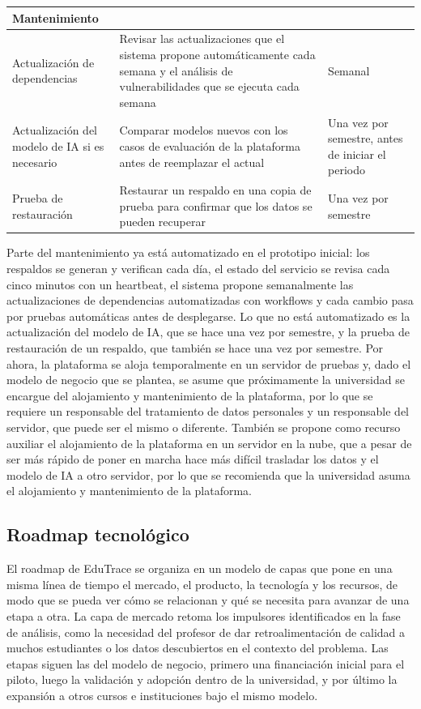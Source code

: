 \documentclass[letterpaper, 10 pt, conference]{ieeeconf}
\begin{document}
\begin{table}[t]
\begin{tabular}{|p{3.6cm}|p{10.6cm}|p{2.4cm}|}
\multicolumn{3}{|l|}{\textbf{Mantenimiento}} \\ \hline
Actualización de dependencias & Revisar las actualizaciones que el sistema propone automáticamente cada semana y el análisis de vulnerabilidades que se ejecuta cada semana & Semanal \\ \hline
Actualización del modelo de IA si es necesario & Comparar modelos nuevos con los casos de evaluación de la plataforma antes de reemplazar el actual  & Una vez por semestre, antes de iniciar el periodo \\ \hline
Prueba de restauración & Restaurar un respaldo en una copia de prueba para confirmar que los datos se pueden recuperar & Una vez por semestre \\ \hline
\end{tabular}
\end{table}

Parte del mantenimiento ya está automatizado en el prototipo inicial: los respaldos se generan y verifican cada día, el estado del servicio se revisa cada cinco minutos con un heartbeat, el sistema propone semanalmente las actualizaciones de dependencias automatizadas con workflows y cada cambio pasa por pruebas automáticas antes de desplegarse.
Lo que no está automatizado es la actualización del modelo de IA, que se hace una vez por semestre, y la prueba de restauración de un respaldo, que también se hace una vez por semestre.
Por ahora, la plataforma se aloja temporalmente en un servidor de pruebas y, dado el modelo de negocio que se plantea, se asume que próximamente la universidad se encargue del alojamiento y mantenimiento de la plataforma, por lo que se requiere un responsable del tratamiento de datos personales y un responsable del servidor, que puede ser el mismo o diferente.
También se propone como recurso auxiliar el alojamiento de la plataforma en un servidor en la nube, que a pesar de ser más rápido de poner en marcha hace más difícil trasladar los datos y el modelo de IA a otro servidor, por lo que se recomienda que la universidad asuma el alojamiento y mantenimiento de la plataforma.

\subsection{Roadmap tecnológico}
El roadmap de EduTrace se organiza en un modelo de capas que pone en una misma línea de tiempo el mercado, el producto, la tecnología y los recursos, de modo que se pueda ver cómo se relacionan y qué se necesita para avanzar de una etapa a otra.
La capa de mercado retoma los impulsores identificados en la fase de análisis, como la necesidad del profesor de dar retroalimentación de calidad a muchos estudiantes o los datos descubiertos en el contexto del problema.
Las etapas siguen las del modelo de negocio, primero una financiación inicial para el piloto, luego la validación y adopción dentro de la universidad, y por último la expansión a otros cursos e instituciones bajo el mismo modelo.
\end{document}
